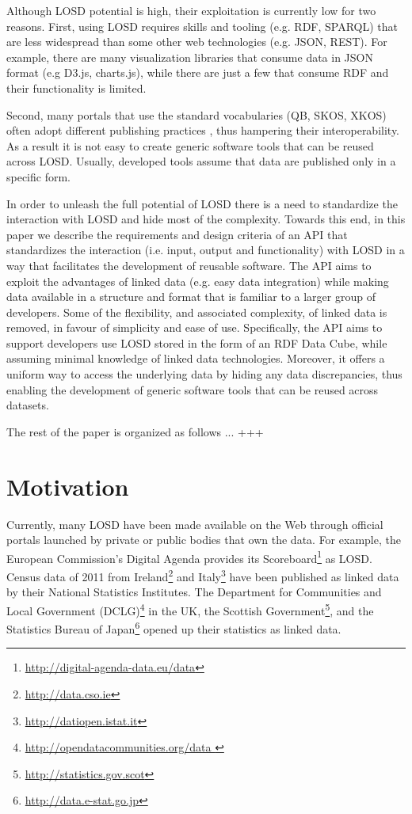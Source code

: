 \documentclass{llncs}
\begin{document}
Although LOSD potential is high, their exploitation is currently low for two reasons. First, using LOSD requires skills and tooling (e.g. RDF, SPARQL) that are less widespread than some other web technologies (e.g. JSON, REST). For example, there are many visualization libraries that consume data in JSON format (e.g D3.js, charts.js), while there are just a few that consume RDF and their functionality is limited. 

Second, many portals that use the standard vocabularies (QB, SKOS, XKOS) often adopt different publishing practices \cite{KalampokisChallenges}, thus hampering their interoperability. As a result it is not easy to create generic software tools that can be reused across LOSD. Usually, developed tools assume that data are published only in a specific form.

In order to unleash the full potential of LOSD there is a need to standardize the interaction with LOSD and hide most of the complexity. Towards this end, in this paper we describe the requirements and design criteria of an API that standardizes the interaction (i.e. input, output and functionality) with LOSD in a way that facilitates the development of reusable software. The API aims to exploit the advantages of linked data (e.g. easy data integration) while making data available in a structure and format that is familiar to a larger group of developers. Some of the flexibility, and associated complexity, of linked data is removed, in favour of simplicity and ease of use. Specifically, the API aims to support developers use LOSD stored in the form of an RDF Data Cube, while assuming minimal knowledge of linked data technologies. Moreover, it offers a uniform way to access the underlying data by hiding any data discrepancies, thus enabling the development of generic software tools that can be reused across datasets. 

The rest of the paper is organized as follows ... +++ 

\section{Motivation}\label{sec:motivation}

Currently, many LOSD have been made available on the Web through official portals launched by private or public bodies that own the data. For example, the European Commission's Digital Agenda provides its Scoreboard\footnote{\url{http://digital-agenda-data.eu/data}} as LOSD. Census data of 2011 from Ireland\footnote{\url{http://data.cso.ie}} and Italy\footnote{\url{http://datiopen.istat.it}} have been published as linked data by their National Statistics Institutes. The Department for Communities and Local Government (DCLG)\footnote{\url{http://opendatacommunities.org/data }} in the UK, the Scottish Government\footnote{\url{http://statistics.gov.scot}}, and the Statistics Bureau of Japan\footnote{\url{http://data.e-stat.go.jp}} opened up their statistics as linked data. 
\end{document}
